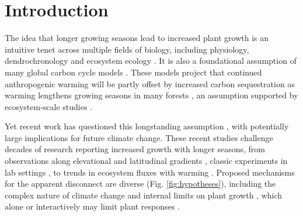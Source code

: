 \documentclass[11pt]{article}
\newcommand{\R}[1]{\label{#1}\linelabel{#1}}
\begin{document}
\section*{Introduction} %

The idea that longer growing seasons lead to increased plant growth is an intuitive tenet across multiple fields of biology, including physiology, dendrochronology and ecosystem ecology \citep{nobel1983biophysical,frank2022dendrochronology}. It is also a foundational assumption of many global carbon cycle models \citep[e.g.][]{ito2020global,friedlingstein2022global}. These models project that continued anthropogenic warming will be partly offset by increased carbon sequestration as warming lengthens growing seasons in many forests \citep{friedlingstein2022global}, an assumption supported by ecosystem-scale studies \citep{chen1999effects,keenan2014net,finzi2020}. 

Yet recent work has questioned this longstanding assumption \citep[e.g.][]{dow2022warm,green2022limits,silvestro2023longer}, with potentially large implications for future climate change. %
These recent studies challenge decades of research reporting increased growth with longer seasons, from observations along elevational and latitudinal gradients \citep[][]{myneni1997increased,berdanier2011growing,king2013tree,cuapio2022there}, classic experiments in lab settings \citep{went1957experimental}, to trends in ecosystem fluxes with warming \citep{chen1999effects,keenan2014net,finzi2020}. Proposed mechanisms for the apparent disconnect are diverse (Fig. \ref{fig:hypotheses}), including the complex nature of climate change \citep[e.g. drought or heat stress,][]{dow2022warm} and internal limits on plant growth \citep{zohner2023effect}, which alone or interactively may limit plant responses \R{forbigKref1}\citep{korner2015paradigm}. %
\end{document}
